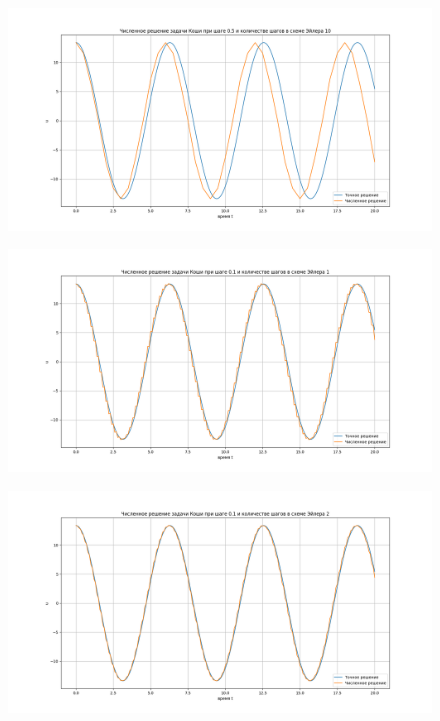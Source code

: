 \documentclass[diploma]{nanolab2015}
\begin{document}
\begin{figure}[h!]
\centering
\includegraphics[scale=0.5]{05 10.png}
\end{figure}

\begin{figure}[h!]
\centering
\includegraphics[scale=0.5]{01 1.png}
\end{figure}

\begin{figure}[h!]
\centering
\includegraphics[scale=0.5]{01 2.png}
\end{figure}
\end{document}
